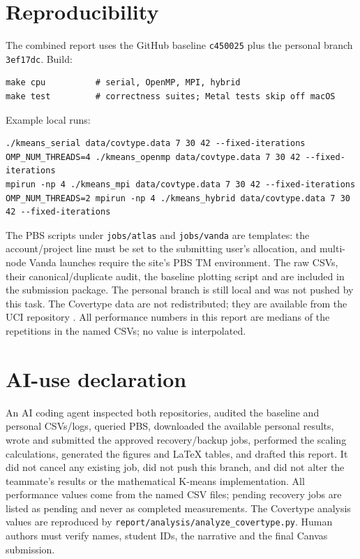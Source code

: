 \documentclass[10pt,a4paper]{article}
\newcommand{\code}[1]{\texttt{#1}}
\begin{document}
\section{Reproducibility}
The combined report uses the GitHub baseline \code{c450025} plus the personal
branch \code{3ef17dc}. Build:
\begin{verbatim}
make cpu          # serial, OpenMP, MPI, hybrid
make test         # correctness suites; Metal tests skip off macOS
\end{verbatim}
Example local runs:
\begin{verbatim}
./kmeans_serial data/covtype.data 7 30 42 --fixed-iterations
OMP_NUM_THREADS=4 ./kmeans_openmp data/covtype.data 7 30 42 --fixed-iterations
mpirun -np 4 ./kmeans_mpi data/covtype.data 7 30 42 --fixed-iterations
OMP_NUM_THREADS=2 mpirun -np 4 ./kmeans_hybrid data/covtype.data 7 30 42 --fixed-iterations
\end{verbatim}
The PBS scripts under \code{jobs/atlas} and \code{jobs/vanda} are templates:
the account/project line must be set to the submitting user's allocation, and
multi-node Vanda launches require the site's PBS TM environment. The raw CSVs,
their canonical/duplicate audit, the baseline plotting script and
 are included in the submission
package. The personal branch is still local and was not pushed by this task. The Covertype data are not redistributed; they are
available from the UCI repository \citep{blackard1999}. All performance
numbers in this report are medians of the repetitions in the named CSVs; no
value is interpolated.

\section{AI-use declaration}
An AI coding agent inspected both repositories, audited the baseline and
personal CSVs/logs, queried PBS, downloaded the available personal results,
wrote and submitted the approved recovery/backup jobs, performed the scaling
calculations, generated the figures and LaTeX tables, and drafted this report.
It did not cancel any existing job, did not push this branch, and did not alter
the teammate's results or the mathematical K-means implementation. All
performance values come from the named CSV files; pending recovery jobs are
listed as pending and never as completed measurements. The Covertype analysis
values are reproduced by \code{report/analysis/analyze\_covertype.py}. Human
authors must verify names, student IDs, the narrative and the final Canvas
submission.



\end{document}
